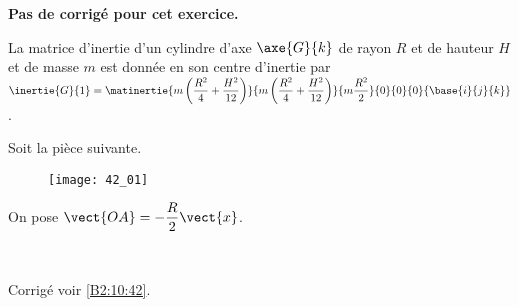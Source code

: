 \normaltrue \difficilefalse \tdifficilefalse
\correctionfalse


\setcounter{numques}{0}
\ifcorrection
\else
\textbf{Pas de corrigé pour cet exercice.}
\fi

\ifprof
\else

La matrice d'inertie d'un cylindre d'axe $\axe{G}{k}$ de rayon $R$ et de hauteur $H$ et de masse $m$ est donnée en son centre d'inertie par 
$\inertie{G}{1}=\matinertie{m\left(\dfrac{R^2}{4}+\dfrac{H^2}{12} \right)}{m\left(\dfrac{R^2}{4}+\dfrac{H^2}{12} \right)}{m\dfrac{R^2}{2}}{0}{0}{0}{\base{i}{j}{k}}$.

Soit la pièce suivante. 
\begin{figure}[H]
\centering
\texttt{[image: 42\_01]}
\end{figure}

On pose $\vect{OA}=-\dfrac{R}{2}\vect{x}$.

\fi


\ifprof
\else
\fi

\ifprof ~\\
\else
\fi


\ifprof
\else
\begin{flushright}
\footnotesize{Corrigé voir \ref{B2:10:42}.}
\end{flushright}%
\fi